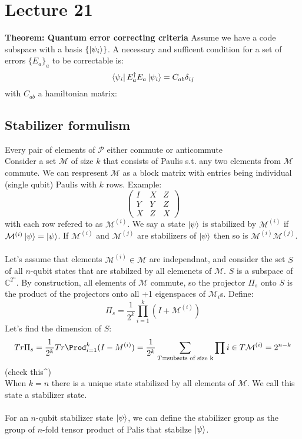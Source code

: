 \documentclass{article}
\begin{document}
\section{Lecture 21}
\textbf{Theorem: Quantum error correcting criteria}
Assume we have a code subspace with a basis $\{\ket{\psi_i}\}$. A necessary and sufficent condition for a set of errors $\{E_a\}_a$ to be correctable is:
$$
\bra{\psi_i} E_a^{\dagger} E_a \ket{\psi_i} = C_{ab} \delta_{ij}
$$
with $C_{ab}$ a hamiltonian matrix:
\subsection{Stabilizer formulism}
Every pair of elements of $\mathcal{P}$ either commute or anticommute\\
Consider a set $\mathcal{M}$ of size $k$ that consists of Paulis s.t. any two elements from $\mathcal{M}$ commute. We can respresent $\mathcal{M}$ as a block matrix with entries being individual (single qubit) Paulis with $k$ rows. Example:
$$
\begin{pmatrix} I & X & Z\\ Y & Y &Z \\ X & Z & X \end{pmatrix}
$$
with each row refered to as $\mathcal{M}^{(i)}$. We say a state $\ket{\psi}$ is stabilized by $\mathcal{M}^{(i)}$ if $\mathcal{M}^{(i)} \ket{\psi} = \ket{\psi}$. If $\mathcal{M}^{(i)}$ and $\mathcal{M}^{(j)}$ are stabilizers of $\ket{\psi}$ then so is $\mathcal{M}^{(i)}\mathcal{M}^{(j)}$.\\\\
Let's assume that elements $\mathcal{M}^{(i)} \in \mathcal{M}$ are independnat, and consider the set $S$ of all $n$-qubit states that are stabilzed by all elemenets of $\mathcal{M}$. $S$ is a subspace of $\mathbb{C}^{2^n}$. By construction, all elements of $\mathcal{M}$ commute, so the projector $\Pi_s$ onto $S$ is the product of the projectors onto all +1 eigenspaces of $\mathcal{M}_i$s. Define: 
$$
\Pi_s = \frac{1}{2^k} \prod_{i=1}^k ( I + \mathcal{M}^{(i)})
$$
Let's find the dimension of $S$:
$$
Tr \Pi_s = \frac{1}{2^k} Tr \Prod_{i=1}^k ( I - M^{(i)}) = \frac{1}{2^k} \sum_{T=\text{subsets of size k}} \prod{i \in T} \mathcal{M}^{(i)} = 2^{n-k}
$$
(check this^)\\
When $k=n$ there is a unique state stabilized by all elements of $\mathcal{M}$. We call this state a stabilizer state. \\\\For an $n$-qubit stabilizer state $\ket{\psi}$, we can define the stabilizer group as the group of $n$-fold tensor product of Palis that stabilze $\ket{\psi}$.\\\\
\end{document}
